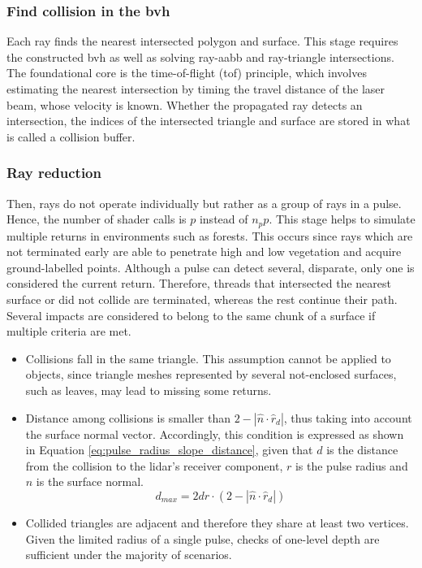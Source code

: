 \subsubsection{Find collision in the \acrshort{bvh}}

Each ray finds the nearest intersected polygon and surface. This stage requires the constructed \acrshort{bvh} as well as solving ray-\acrshort{aabb} and ray-triangle intersections. The foundational core is the time-of-flight (\acrshort{tof}) principle, which involves estimating the nearest intersection by timing the travel distance of the laser beam, whose velocity is known. Whether the propagated ray detects an intersection, the indices of the intersected triangle and surface are stored in what is called a collision buffer. 

\subsubsection{Ray reduction}

Then, rays do not operate individually but rather as a group of rays in a pulse. Hence, the number of shader calls is $p$ instead of $n_{p}p$. This stage helps to simulate multiple returns in environments such as forests. This occurs since rays which are not terminated early are able to penetrate high and low vegetation and acquire ground-labelled points. Although a pulse can detect several, disparate, only one is considered the current return. Therefore, threads that intersected the nearest surface or did not collide are terminated, whereas the rest continue their path. Several impacts are considered to belong to the same chunk of a surface if multiple criteria are met. 
\begin{itemize}
    \item Collisions fall in the same triangle. This assumption cannot be applied to objects, since triangle meshes represented by several not-enclosed surfaces, such as leaves, may lead to missing some returns.
    \item Distance among collisions is smaller than $2 - \left|\hat{n} \cdot \hat{r}_{d}\right|$, thus taking into account the surface normal vector. Accordingly, this condition is expressed as shown in Equation \ref{eq:pulse_radius_slope_distance}, given that $d$ is the distance from the collision to the \acrshort{lidar}'s receiver component, $r$ is the pulse radius and $\hat{n}$ is the surface normal.
    \begin{equation}
        \label{eq:pulse_radius_slope_distance}
        d_{\textit{max}} = 2dr \cdot (2 - \left|\hat{n} \cdot \hat{r}_{d}\right|)
    \end{equation}
    \item Collided triangles are adjacent and therefore they share at least two vertices. Given the limited radius of a single pulse, checks of one-level depth are sufficient under the majority of scenarios.
\end{itemize}

